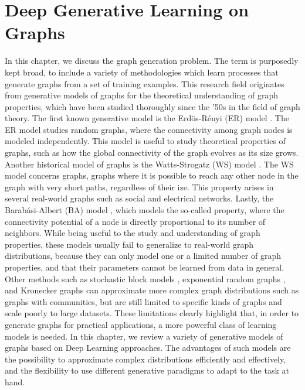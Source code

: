 \chapter{Deep Generative Learning on Graphs} %
\label{ch:deep-generative-learning-graphs}
In this chapter, we discuss the graph generation problem. The term  is purposedly kept broad, to include a variety of methodologies which learn processes that generate graphs from a set of training examples. This research field originates from generative models of graphs for the theoretical understanding of graph properties, which have been studied thoroughly since the '50s in the field of graph theory. The first known generative model is the  Erd\"{o}s-R\'{e}nyi (ER) model \cite{erdos1959randomgraphs}. The ER model studies random graphs, where the connectivity among graph nodes is modeled independently. This model is useful to study theoretical properties of graphs, such as how the global connectivity of the graph evolves as its size grows. Another historical model of graphs is the  Watts-Strogatz (WS)  model \cite{watts1998smallworld}. The WS model concerns  graphs, \ie graphs where it is possible to reach any other node in the graph with very short paths, regardless of their ize. This property arises in several real-world graphs such as social and electrical networks. Lastly, the Barab{\'a}si-Albert (BA) model \cite{barabasi1999prefatt}, which models the so-called  property, where the connectivity potential of a node is directly proportional to its number of neighbors. While being useful to the study and understanding of graph properties, these models usually fail to generalize to real-world graph distributions, because they can only model one or a limited number of graph properties, and that their parameters cannot be learned from data in general. Other methods such as stochastic block models \citep{airoldi2008mixedstochasticblock}, exponential random graphs \citep{robins2007exponentialrandomgraphs}, and Kronecker graphs \citep{leskovec2010kronecker} can approximate more complex graph distributions such as graphs with communities, but are still limited to specific kinds of graphs and scale poorly to large datasets.
These limitations clearly highlight that, in order to generate graphs for practical applications, a more powerful class of learning models is needed. In this chapter, we review a variety of generative models of graphs based on Deep Learning approaches. The advantages of such models are the possibility to approximate complex distributions efficiently and effectively, and the flexibility to use different generative paradigms to adapt to the task at hand.

